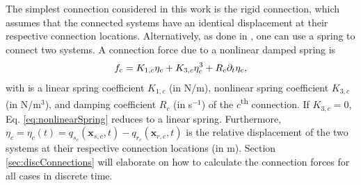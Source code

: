 \documentclass{article}
\begin{document}
The simplest connection considered in this work is the rigid connection, which assumes that the connected systems have an identical displacement at their respective connection locations. Alternatively, as done in \cite{theBible, Bilbao2009Modular}, one can use a spring to connect two systems. A connection force due to a nonlinear damped spring is
\begin{equation}\label{eq:nonlinearSpring}
    f_{\text{c}} = K_{1, c}\eta_c + K_{3, c}\eta_c^3 + R_c\partial_t \eta_c,
\end{equation}
with is a linear spring coefficient $K_{1, c}$ (in N/m),  nonlinear spring coefficient $K_{3, c}$ (in N/m$^3$), and damping coefficient $R_c$ (in s$^{-1}$) of the $c$\textsuperscript{th} connection. If $K_{3, c} = 0$, Eq. \eqref{eq:nonlinearSpring} reduces to a linear spring. Furthermore, $\eta_c = \eta_c(t) = q_{s_c}(\boldsymbol{x}_{s,c} ,t) - q_{r_c}(\boldsymbol{x}_{r,c} ,t)$ is the relative displacement of the two systems at their respective connection locations (in m). %
Section \ref{sec:discConnections} will elaborate on how to calculate the connection forces for all cases in discrete time.

  
\end{document}
